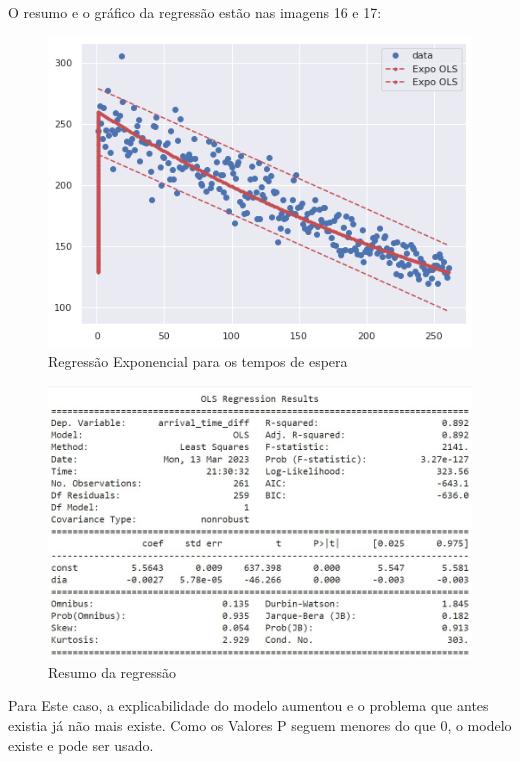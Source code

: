 O resumo e o gráfico da regressão estão nas imagens 16 e 17:
\begin{figure}[H]
    \includegraphics{analise-de-dados/regressao/regressao_EXPO.png}
    \caption{Regressão Exponencial para os tempos de espera}
    \label{fig: plot_Expo_OLS}
\end{figure}

\begin{figure}[H]
    \includegraphics[scale = 0.85]{analise-de-dados/regressao/EXPO_OLS_Summary.jpg}
    \caption{Resumo da regressão}
    \label{fig: sum_Expo_OLS}
\end{figure}

Para Este caso, a explicabilidade do modelo aumentou e o problema que antes existia já não mais existe. Como os Valores P seguem menores do que 0, o modelo existe e pode ser usado.
